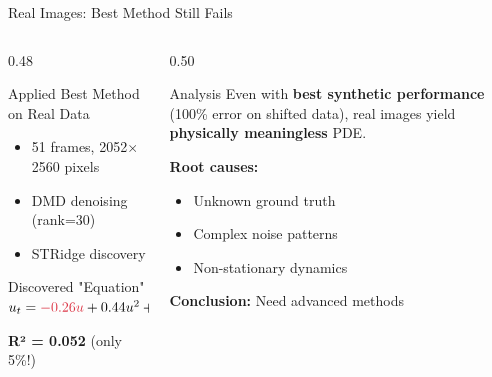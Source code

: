 \documentclass[aspectratio=169]{beamer}
\begin{document}
\begin{frame}{Real Images: Best Method Still Fails}

\begin{columns}[T]
    \begin{column}{0.48\textwidth}
        \begin{block}{Applied Best Method on Real Data}
            \begin{itemize}
                \item 51 frames, 2052$\times$2560 pixels
                \item DMD denoising (rank=30)
                \item STRidge discovery
            \end{itemize}
        \end{block}
        
        \begin{alertblock}{Discovered "Equation"}
            $u_t = \textcolor{alertred}{-0.26u} + 0.44u^2 + 0.05u_y$
            
            \vspace{0.2cm}
            \textbf{R² = 0.052} \textcolor{alertred}{(only 5\%!)}
        \end{alertblock}
    \end{column}
    
    \begin{column}{0.50\textwidth}
        \begin{exampleblock}{Analysis}
            Even with \textbf{best synthetic performance} (100\% error on shifted data), real images yield \textbf{physically meaningless} PDE.
            
            \vspace{0.3cm}
            \textbf{Root causes:}
            \begin{itemize}
                \item Unknown ground truth
                \item Complex noise patterns
                \item Non-stationary dynamics
            \end{itemize}
        \end{exampleblock}
        
        \vspace{0.2cm}
        \textcolor{infocolor}{\textbf{Conclusion:} Need advanced methods}
    \end{column}
\end{columns}

\end{frame}
\end{document}
